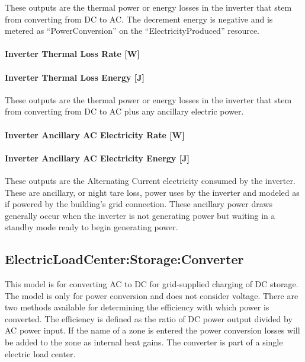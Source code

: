 These outputs are the thermal power or energy losses in the inverter that stem from converting from DC to AC. The decrement energy is negative and is metered as ``PowerConversion'' on the ``ElectricityProduced'' resource.

\paragraph{Inverter Thermal Loss Rate {[}W{]}}\label{inverter-thermal-loss-rate-w}

\paragraph{Inverter Thermal Loss Energy {[}J{]}}\label{inverter-thermal-loss-energy-j}

These outputs are the thermal power or energy losses in the inverter that stem from converting from DC to AC plus any ancillary electric power.

\paragraph{Inverter Ancillary AC Electricity Rate {[}W{]}}\label{inverter-ancillary-ac-electric-power-w}

\paragraph{Inverter Ancillary AC Electricity Energy {[}J{]}}\label{inverter-ancillary-ac-electric-energy-j}

These outputs are the Alternating Current electricity consumed by the inverter. These are ancillary, or night tare loss, power uses by the inverter and modeled as if powered by the building's grid connection. These ancillary power draws generally occur when the inverter is not generating power but waiting in a standby mode ready to begin generating power.

\subsection{ElectricLoadCenter:Storage:Converter}\label{electricloadcenterstorageconverter}

This model is for converting AC to DC for grid-supplied charging of DC storage. The model is only for power conversion and does not consider voltage. There are two methods available for determining the efficiency with which power is converted. The efficiency is defined as the ratio of DC power output divided by AC power input. If the name of a zone is entered the power conversion losses will be added to the zone as internal heat gains. The converter is part of a single electric load center.

